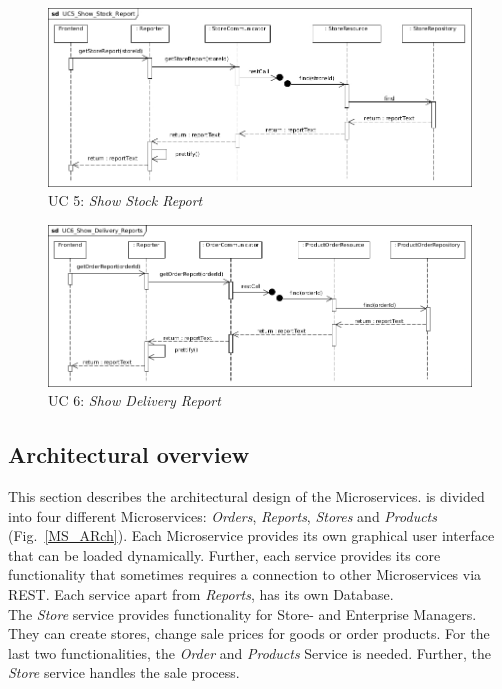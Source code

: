 	
			
			\begin{figure}[!h]
				\centering
				\includegraphics[width = 1\textwidth]{img/UC5_Show_Stock_Report.jpg}
				\caption{UC 5: \textit{Show Stock Report}}
				\label{MS_UC5}
			\end{figure}
			
			\begin{figure}[!h]
				\centering
				\includegraphics[width = 1\textwidth]{img/UC6_Show_Delivery_Reports.jpg}
				\caption{UC 6: \textit{Show Delivery Report}}
				\label{MS_UC6}
			\end{figure}
			
	\FloatBarrier
	\subsection{Architectural overview}	\label{archiOverviewMicro}	
	This section describes the architectural design of the Microservices. \CoCoME is divided into four different Microservices: \textit{Orders}, \textit{Reports}, \textit{Stores} and \textit{Products} (Fig.~\ref{MS_ARch}). Each Microservice provides its own graphical user interface that can be loaded dynamically. Further, each service provides its core functionality that sometimes requires a connection to other Microservices via REST. Each service apart  from \textit{Reports}, has its own Database. \\
	The \textit{Store} service provides functionality for Store- and Enterprise Managers. They can create stores, change sale prices for goods or order products. For the last two functionalities, the \textit{Order} and \textit{Products} Service is needed. Further, the \textit{Store} service handles the sale process. 
	


